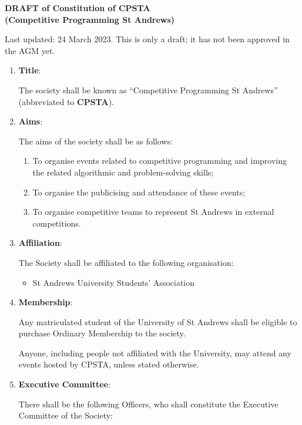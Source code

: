 \documentclass[11pt]{article}
\begin{document}
\begin{center}
\textbf{\LARGE DRAFT of Constitution of CPSTA\\ (Competitive Programming St Andrews)}
\end{center}

Last updated: 24 March 2023. This is only a draft; it has not been approved in the AGM yet.

\begin{enumerate}[label = \Roman*.]

\item \textbf{Title}: 

The society shall be known as “Competitive Programming St Andrews” (abbreviated to \textbf{CPSTA}).

\item \textbf{Aims}: 

The aims of the society shall be as follows:
    \begin{enumerate}[label = \arabic*.]
    \item To organise events related to competitive programming and improving the related algorithmic and problem-solving skills;
    \item To organise the publicising and attendance of these events;
    \item To organise competitive teams to represent St Andrews in external competitions.
    \end{enumerate}

\item \textbf{Affiliation}:

The Society shall be affiliated to the following organisation:

\begin{itemize}
    \item St Andrews University Students' Association
\end{itemize}

\item \textbf{Membership}: 

Any matriculated student of the University of St Andrews shall be eligible to purchase Ordinary Membership to the society.

Anyone, including people not affiliated with the University, may attend any events hosted by CPSTA, unless stated otherwise.

\item \textbf{Executive Committee}: 

There shall be the following Officers, who shall constitute the Executive Committee of the Society:


\end{enumerate}
\end{document}
